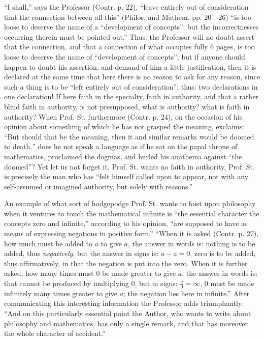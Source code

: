 \documentclass[12pt,a4paper,openany]{book}
\newcommand{\opage}[1]{\marginnote{\footnotesize\textit{[#1]}}}
\begin{document}
``I shall,'' says the Professor (Contr. p. 22), ``leave entirely out of consideration that the connection between all
\opage{39}\setcounter{footnote}{0}%
this'' (Philos. and Mathem. pp. 20---26) ``is too loose to
deserve the name of a ``development of concepts''; but the incorrectnesses occurring therein
must be pointed out.'' Thus: the Professor
will no doubt assert that the connection, and that a connection of what occupies fully 6 pages, is too loose to
deserve the name of ``development of concepts''; but if anyone
should happen to doubt his assertion, and demand of him
a little justification, then it is declared at the same time that here there is no reason to ask for any
reason, since such a thing is to be ``left entirely out of consideration'';
thus: two declarations in one declaration! If here
faith in the specialty, faith in authority, and that a rather
blind faith in authority, is not presupposed, what is authority? what is faith in authority? When Prof. St. furthermore (Contr. p. 24), on
the occasion of his opinion about something of which he has not
grasped the meaning, exclaims: ``But should that be the meaning, then it and similar remarks would be doomed to death,'' does he not speak a language as if he sat on
the papal throne of mathematics, proclaimed the dogmas, and hurled his anathema
against ``the doomed''? Yet let us
not forget it, Prof. St. wants no faith in authority,
Prof. St. is precisely the man who has ``felt himself called upon to appear, not with any self-assumed or imagined authority, but solely with reasons.''

An example of what sort of hodgepodge Prof.
St. wants to foist upon philosophy when it ventures to
touch the mathematical infinite is ``the essential character the concepts zero and infinite,'' according to his opinion,
``are supposed to have as means of expressing negations in positive form.''
``When it is asked (Contr. p. 27), how much must be added
to $a$ to give $a$, the answer in words is: nothing is to be added,
thus \emph{negatively}, but the answer in signs is:
$a-a = 0$, zero is to be added, thus affirmatively,
in that the negation is put into the zero. When it is further
asked, how many times must $0$ be made greater to give
\opage{40}\setcounter{footnote}{0}%
$a$, the answer in words is: that cannot be produced by
multiplying $0$, but in signs: $\frac{a}{0} = \infty$, $0$ must be made infinitely many times greater to give $a$; the negation lies
here in infinite.'' After communicating this interesting
information the Professor adds triumphantly: ``And on
this particularly essential point the Author, who
wants to write about philosophy and mathematics, has only a
single remark, and that has moreover the whole character of accident.''
\end{document}
